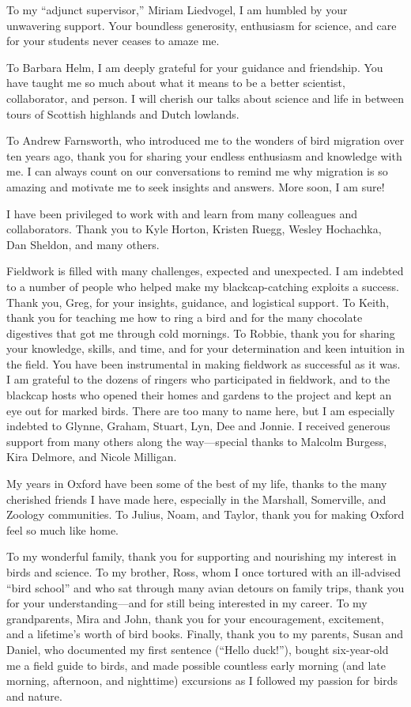 \documentclass[a4paper, nobind]{templates/ociamthesis}
\begin{document}
\begin{romanpages}
\begin{acknowledgements}
To my ``adjunct supervisor,'' Miriam Liedvogel, I am humbled by your unwavering support. Your boundless generosity, enthusiasm for science, and care for your students never ceases to amaze me.

To Barbara Helm, I am deeply grateful for your guidance and friendship. You have taught me so much about what it means to be a better scientist, collaborator, and person. I will cherish our talks about science and life in between tours of Scottish highlands and Dutch lowlands.

To Andrew Farnsworth, who introduced me to the wonders of bird migration over ten years ago, thank you for sharing your endless enthusiasm and knowledge with me. I can always count on our conversations to remind me why migration is so amazing and motivate me to seek insights and answers. More soon, I am sure!

I have been privileged to work with and learn from many colleagues and collaborators. Thank you to Kyle Horton, Kristen Ruegg, Wesley Hochachka, Dan Sheldon, and many others.

Fieldwork is filled with many challenges, expected and unexpected. I am indebted to a number of people who helped make my blackcap-catching exploits a success. Thank you, Greg, for your insights, guidance, and logistical support. To Keith, thank you for teaching me how to ring a bird and for the many chocolate digestives that got me through cold mornings. To Robbie, thank you for sharing your knowledge, skills, and time, and for your determination and keen intuition in the field. You have been instrumental in making fieldwork as successful as it was. I am grateful to the dozens of ringers who participated in fieldwork, and to the blackcap hosts who opened their homes and gardens to the project and kept an eye out for marked birds. There are too many to name here, but I am especially indebted to Glynne, Graham, Stuart, Lyn, Dee and Jonnie. I received generous support from many others along the way---special thanks to Malcolm Burgess, Kira Delmore, and Nicole Milligan.

My years in Oxford have been some of the best of my life, thanks to the many cherished friends I have made here, especially in the Marshall, Somerville, and Zoology communities.
To Julius, Noam, and Taylor, thank you for making Oxford feel so much like home.

To my wonderful family, thank you for supporting and nourishing my interest in birds and science. To my brother, Ross, whom I once tortured with an ill-advised ``bird school'' and who sat through many avian detours on family trips, thank you for your understanding---and for still being interested in my career. To my grandparents, Mira and John, thank you for your encouragement, excitement, and a lifetime's worth of bird books. Finally, thank you to my parents, Susan and Daniel, who documented my first sentence (``Hello duck!''), bought six-year-old me a field guide to birds, and made possible countless early morning (and late morning, afternoon, and nighttime) excursions as I followed my passion for birds and nature.
\end{acknowledgements}


\end{romanpages}
\end{document}
